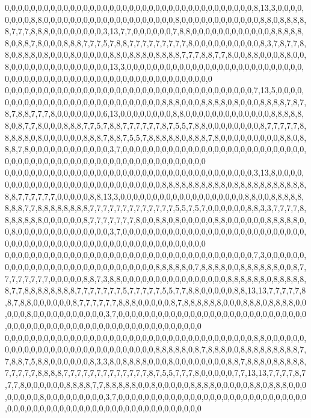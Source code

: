0,0,0,0,0,0,0,0,0,0,0,0,0,0,0,0,0,0,0,0,0,0,0,0,0,0,0,0,0,0,0,0,0,0,0,0,0,0,8,13,3,0,0,0,0,0,0,0,0,8,8,0,0,0,0,0,0,0,0,0,0,0,0,0,0,0,0,0,0,0,0,8,0,0,0,0,0,0,0,0,0,0,0,0,8,8,0,8,8,8,8,8,7,7,7,8,8,8,0,0,0,0,0,0,0,0,3,13,7,7,0,0,0,0,0,0,7,8,8,0,0,0,0,0,0,0,0,0,0,0,0,8,8,8,8,8,8,0,8,8,7,8,0,0,0,8,8,8,7,7,7,5,7,8,8,7,7,7,7,7,7,7,7,7,8,0,0,0,0,0,0,0,0,0,0,8,3,7,8,7,7,8,8,0,8,8,8,0,8,0,0,0,8,0,0,0,0,0,8,8,0,8,8,8,0,8,8,8,8,7,7,7,8,8,7,7,8,0,0,8,8,0,0,0,8,8,0,0,8,0,0,0,0,0,0,0,0,0,0,0,0,0,0,0,13,3,0,0,0,0,0,0,0,0,0,0,0,0,0,0,0,0,0,0,0,0,0,0,0,0,0,0,0,0,0,0,0,0,0,0,0,0,0,0,0,0,0,0,0,0,0,0,0,0,0,0,0,0,0,0,0,0,0,0,0
0,0,0,0,0,0,0,0,0,0,0,0,0,0,0,0,0,0,0,0,0,0,0,0,0,0,0,0,0,0,0,0,0,0,0,0,0,0,7,13,5,0,0,0,0,0,0,0,0,0,0,0,0,0,0,0,0,0,0,0,0,0,0,0,0,0,0,0,0,8,8,8,0,0,0,8,8,8,8,0,8,0,0,0,8,8,8,8,7,8,7,8,7,8,8,7,7,7,8,0,0,0,0,0,0,0,6,13,0,0,0,0,0,0,0,0,8,8,0,0,0,0,0,0,0,0,0,0,0,0,0,8,8,8,8,8,8,0,8,7,7,8,0,0,0,8,8,8,7,7,5,7,8,8,7,7,7,7,7,7,8,7,5,5,7,8,8,0,0,0,0,0,0,0,0,8,7,7,7,7,7,8,8,8,8,8,0,8,0,0,0,0,0,0,8,8,8,7,8,8,7,5,5,7,8,8,8,8,8,0,8,8,8,7,8,0,0,0,0,0,0,0,0,0,8,8,0,8,8,8,7,8,0,0,0,0,0,0,0,0,0,0,0,0,3,7,0,0,0,0,0,0,0,0,0,0,0,0,0,0,0,0,0,0,0,0,0,0,0,0,0,0,0,0,0,0,0,0,0,0,0,0,0,0,0,0,0,0,0,0,0,0,0,0,0,0,0,0,0,0,0,0,0,0,0
0,0,0,0,0,0,0,0,0,0,0,0,0,0,0,0,0,0,0,0,0,0,0,0,0,0,0,0,0,0,0,0,0,0,0,0,0,0,3,13,8,0,0,0,0,0,0,0,0,0,0,0,0,0,0,0,0,0,0,0,0,0,0,0,0,0,0,0,0,8,8,8,8,8,8,8,8,8,8,0,8,8,8,8,8,8,8,8,8,8,8,8,8,7,7,7,7,7,7,0,0,0,0,0,8,8,13,3,0,0,0,0,0,0,0,0,0,0,0,0,0,0,0,0,0,0,0,8,8,0,0,8,8,8,8,8,8,8,8,7,7,8,8,8,8,8,8,8,8,7,7,7,7,7,7,7,7,7,7,7,7,7,5,5,7,5,7,0,0,0,0,0,0,8,8,3,3,7,7,7,7,8,8,8,8,8,8,8,0,0,0,0,0,0,8,7,7,7,7,7,7,7,8,0,0,8,8,0,8,0,0,0,0,0,8,8,0,0,0,0,0,0,8,8,8,8,8,0,0,8,0,0,0,0,0,0,0,0,0,0,0,0,0,0,3,7,0,0,0,0,0,0,0,0,0,0,0,0,0,0,0,0,0,0,0,0,0,0,0,0,0,0,0,0,0,0,0,0,0,0,0,0,0,0,0,0,0,0,0,0,0,0,0,0,0,0,0,0,0,0,0,0,0,0,0
0,0,0,0,0,0,0,0,0,0,0,0,0,0,0,0,0,0,0,0,0,0,0,0,0,0,0,0,0,0,0,0,0,0,0,0,0,0,7,3,0,0,0,0,0,0,0,0,0,0,0,0,0,0,0,0,0,0,0,0,0,0,0,0,0,0,0,0,0,8,8,8,8,8,0,7,8,8,8,8,0,0,8,8,8,8,8,8,0,0,8,7,7,7,7,7,7,7,7,0,0,0,0,0,8,8,7,3,8,8,0,0,0,0,0,0,0,0,0,0,0,0,0,0,0,0,8,8,8,8,8,8,0,8,8,8,8,8,8,7,7,8,8,8,8,8,8,8,8,7,7,7,7,7,7,7,5,7,7,7,7,7,5,5,7,7,8,8,0,0,0,0,0,8,8,13,13,7,7,7,7,7,8,8,7,8,8,0,0,0,0,0,0,8,7,7,7,7,7,7,8,8,8,0,0,0,0,0,8,7,8,8,8,8,8,8,0,0,0,8,8,8,0,8,8,8,8,0,0,0,0,0,8,0,0,0,0,0,0,0,0,0,0,0,3,7,0,0,0,0,0,0,0,0,0,0,0,0,0,0,0,0,0,0,0,0,0,0,0,0,0,0,0,0,0,0,0,0,0,0,0,0,0,0,0,0,0,0,0,0,0,0,0,0,0,0,0,0,0,0,0,0,0,0,0
0,0,0,0,0,0,0,0,0,0,0,0,0,0,0,0,0,0,0,0,0,0,0,0,0,0,0,0,0,0,0,0,0,0,0,0,0,0,8,8,0,0,0,0,0,0,0,0,0,0,0,0,0,0,0,0,0,0,0,0,0,0,0,0,0,0,0,0,0,8,8,8,8,8,0,8,7,8,8,8,0,0,8,8,8,8,8,8,8,8,8,7,7,8,8,7,5,8,8,0,0,0,0,0,0,8,3,3,8,0,8,8,8,8,0,0,0,8,0,0,0,0,0,0,0,0,8,8,7,8,8,8,0,8,8,8,8,8,7,7,7,7,7,8,8,8,8,7,7,7,7,7,7,7,7,7,7,7,7,7,8,7,5,5,7,7,7,8,0,0,0,0,0,7,7,13,13,7,7,7,7,8,7,7,7,8,0,0,0,0,0,0,8,8,8,8,7,7,8,8,8,8,8,0,0,8,0,0,0,0,0,8,8,8,8,0,0,0,0,0,8,8,0,8,8,8,0,0,0,0,0,0,0,0,8,0,0,0,0,0,0,0,0,0,3,7,0,0,0,0,0,0,0,0,0,0,0,0,0,0,0,0,0,0,0,0,0,0,0,0,0,0,0,0,0,0,0,0,0,0,0,0,0,0,0,0,0,0,0,0,0,0,0,0,0,0,0,0,0,0,0,0,0,0,0
